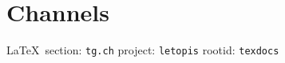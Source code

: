  
 

\section{Channels}
\label{sec:tg.ch}

\vspace{0.5cm}
 {\ifDEBUG\small\LaTeX~section: \verb|tg.ch| project: \verb|letopis| rootid: \verb|texdocs|	\fi}
\vspace{0.5cm}

  

